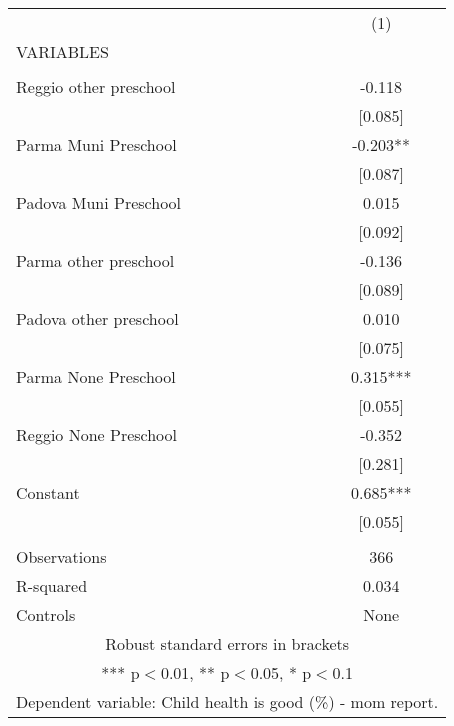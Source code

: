 \begin{tabular}{lc} \hline
 & (1) \\
VARIABLES &  \\ \hline
 &  \\
Reggio other preschool & -0.118 \\
 & [0.085] \\
Parma Muni Preschool & -0.203** \\
 & [0.087] \\
Padova Muni Preschool & 0.015 \\
 & [0.092] \\
Parma other preschool & -0.136 \\
 & [0.089] \\
Padova other preschool & 0.010 \\
 & [0.075] \\
Parma None Preschool & 0.315*** \\
 & [0.055] \\
Reggio None Preschool & -0.352 \\
 & [0.281] \\
Constant & 0.685*** \\
 & [0.055] \\
 &  \\
Observations & 366 \\
R-squared & 0.034 \\
 Controls & None \\ \hline
\multicolumn{2}{c}{ Robust standard errors in brackets} \\
\multicolumn{2}{c}{ *** p$<$0.01, ** p$<$0.05, * p$<$0.1} \\
\multicolumn{2}{c}{ Dependent variable: Child health is good (\%) - mom report.} \\
\end{tabular}
